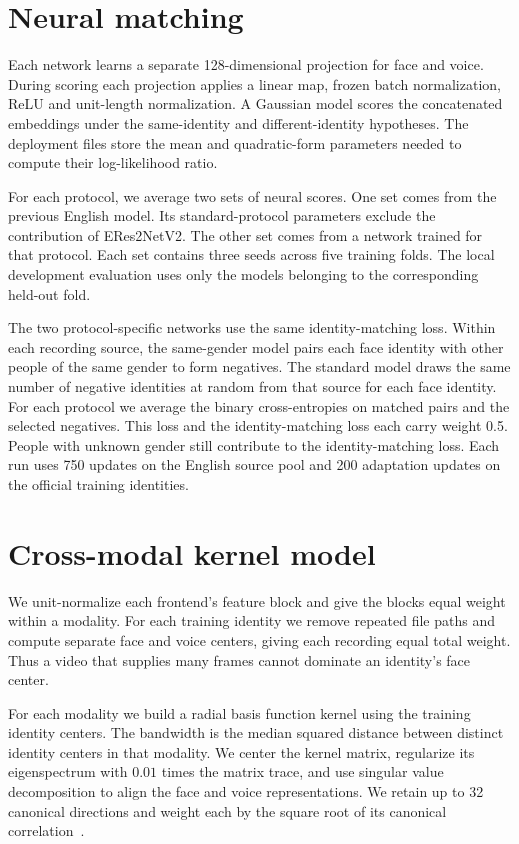 \documentclass[10pt,letterpaper]{article}
\begin{document}
\section{Neural matching}
Each network learns a separate 128-dimensional projection for face
and voice. During scoring each projection applies a linear map, frozen
batch normalization, ReLU and unit-length normalization. A Gaussian
model scores the concatenated embeddings under the same-identity and
different-identity hypotheses. The deployment files store the mean and
quadratic-form parameters needed to compute their log-likelihood ratio.

For each protocol, we average two sets of neural scores. One set comes
from the previous English model. Its standard-protocol parameters
exclude the contribution of ERes2NetV2. The other set comes from a
network trained for that protocol. Each set contains three seeds across
five training folds. The local development evaluation uses only the
models belonging to the corresponding held-out fold.

The two protocol-specific networks use the same identity-matching loss.
Within each recording source, the same-gender model pairs each face
identity with other people of the same gender to form negatives. The
standard model draws the same number of negative identities at random
from that source for each face identity. For each protocol we average
the binary cross-entropies on matched pairs and the selected negatives.
This loss and the identity-matching loss each carry weight 0.5. People
with unknown gender still contribute to the identity-matching loss.
Each run uses 750 updates on the English source pool and 200 adaptation
updates on the official training identities.

\section{Cross-modal kernel model}
We unit-normalize each frontend's feature block and give the blocks
equal weight within a modality. For each training identity we remove
repeated file paths and compute separate face and voice centers, giving
each recording equal total weight. Thus a video that supplies many
frames cannot dominate an identity's face center.

For each modality we build a radial basis function kernel using the
training identity centers. The bandwidth is the median squared distance
between distinct identity centers in that modality. We center the
kernel matrix, regularize its eigenspectrum with \(0.01\) times the
matrix trace, and use singular value decomposition to align the face
and voice representations. We retain up to 32 canonical directions
and weight each by the square root of its canonical correlation~\cite{kcca}.
\end{document}
